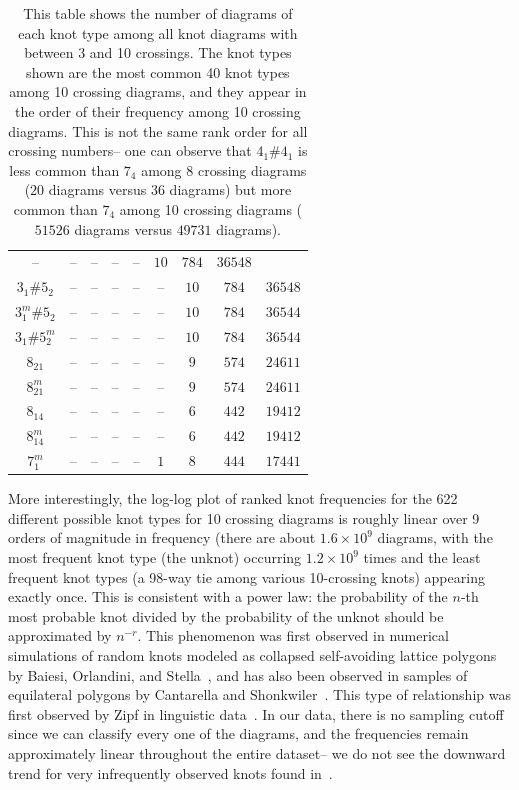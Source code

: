 \documentclass[amsmath,secnumarabic,amssymb,floatfix,nofootinbib,nobibnotes,letterpaper,11pt,tightenlines,showkeys]{revtex4}
\theoremstyle{definition}
\let\mgp=\marginpar \marginparwidth18mm \marginparsep1mm
\def\marginpar#1{\mgp{\raggedright\tiny #1}}
\let\lbl=\label
\def\label#1{\lbl{#1}\ifinner\else\marginpar{\ref{#1} #1}\ignorespaces\fi}
\begin{document}
\begin{table}[H]
\begin{ruledtabular}
\begin{tabular}{ccccccccc}
-- &
-- &
-- &
-- &
-- &
$\num{10}$ &
$\num{784}$ &
$\num{36548}$\\
$3_{1}^{}\#5_{2}^{}$ &
-- &
-- &
-- &
-- &
-- &
$\num{10}$ &
$\num{784}$ &
$\num{36548}$\\
$3_{1}^{m}\#5_{2}^{}$ &
-- &
-- &
-- &
-- &
-- &
$\num{10}$ &
$\num{784}$ &
$\num{36544}$\\
$3_{1}^{}\#5_{2}^{m}$ &
-- &
-- &
-- &
-- &
-- &
$\num{10}$ &
$\num{784}$ &
$\num{36544}$\\
$8_{21}^{}$ &
-- &
-- &
-- &
-- &
-- &
$\num{9}$ &
$\num{574}$ &
$\num{24611}$\\
$8_{21}^{m}$ &
-- &
-- &
-- &
-- &
-- &
$\num{9}$ &
$\num{574}$ &
$\num{24611}$\\
$8_{14}^{}$ &
-- &
-- &
-- &
-- &
-- &
$\num{6}$ &
$\num{442}$ &
$\num{19412}$\\
$8_{14}^{m}$ &
-- &
-- &
-- &
-- &
-- &
$\num{6}$ &
$\num{442}$ &
$\num{19412}$\\
$7_{1}^{m}$ &
-- &
-- &
-- &
-- &
$\num{1}$ &
$\num{8}$ &
$\num{444}$ &
$\num{17441}$
\end{tabular}
\end{ruledtabular}
\caption{This table shows the number of diagrams of each knot type among all knot diagrams with between 3 and 10 crossings. The knot types shown are the most common 40 knot types among 10 crossing diagrams, and they appear in the order of their frequency among 10 crossing diagrams. This is not the same rank order for all crossing numbers-- one can observe that $4_1 \# 4_1$ is less common than $7_4$ among 8 crossing diagrams ($\num{20}$ diagrams versus $\num{36}$ diagrams) but more common than $7_4$ among 10 crossing diagrams ($\num{51526}$ diagrams versus $\num{49731}$ diagrams).}
\label{tab:knot frequency raw data}
\end{table}

More interestingly, the log-log plot of ranked knot frequencies for the 622
different possible knot types for 10 crossing diagrams is roughly linear over 9
orders of magnitude in frequency (there are about $1.6 \times 10^9$ diagrams,
with the most frequent knot type (the unknot) occurring $1.2 \times 10^9$ times
and the least frequent knot types (a 98-way tie among various 10-crossing knots)
appearing exactly once. This is consistent with a power law: the probability of 
the $n$-th most probable knot divided by the probability of the unknot should be 
approximated by $n^{-r}$. This phenomenon was first observed in numerical simulations of random knots modeled as collapsed self-avoiding lattice polygons by Baiesi, Orlandini, and Stella~\cite{Orlandini:2007PRL}, and has also been observed in 
samples of equilateral polygons by Cantarella and Shonkwiler~\cite{Cantarella:2016bt}. This type of relationship was first observed by Zipf in linguistic data~\cite{zipf1949human}. In our data, there is no sampling cutoff since we can classify every one of the diagrams, and the frequencies remain approximately linear throughout the entire dataset-- we do not see the downward trend for very infrequently observed knots found in~\cite{Orlandini:2007PRL}.  
\end{document}
